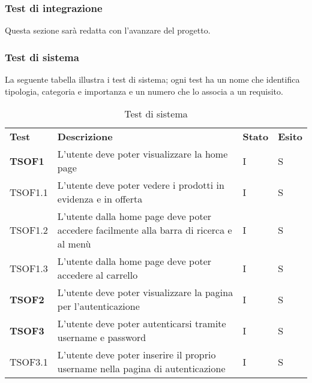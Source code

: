 \subsubsection{Test di integrazione}
Questa sezione sarà redatta con l'avanzare del progetto.
\pagebreak
\subsubsection{Test di sistema}
La seguente tabella illustra i test di sistema; ogni test ha un nome che identifica tipologia, categoria e importanza e un numero che lo associa a un requisito.
\begin{center}
    \centering
    \renewcommand{\arraystretch}{1.8}
    \label{tab:TestSistema}
    \begin{longtable}[!h]{p{60px} p{240px} p{35px} p{35px}}
        \caption{Test di sistema}                                                                                                                               \\
        \rowcolor{logo!70}
        \textbf{Test}   & \textbf{Descrizione}                                                                                & \textbf{Stato} & \textbf{Esito} \\
        \textbf{TSOF1}  & L'utente deve poter visualizzare la home page                                                       & I              & S              \\
        TSOF1.1         & L'utente deve poter vedere i prodotti in evidenza e in offerta                                      & I              & S              \\
        TSOF1.2         & L'utente dalla home page deve poter accedere facilmente alla barra di ricerca e al menù             & I              & S              \\
        TSOF1.3         & L'utente dalla home page deve poter accedere al carrello                                            & I              & S              \\
        \textbf{TSOF2}  & L'utente deve poter visualizzare la pagina per l'autenticazione                                     & I              & S              \\
        \textbf{TSOF3}  & L'utente deve poter autenticarsi tramite username e password                                        & I              & S              \\
        TSOF3.1         & L'utente deve poter inserire il proprio username nella pagina di autenticazione                     & I              & S              \\

\end{longtable}
\end{center}
